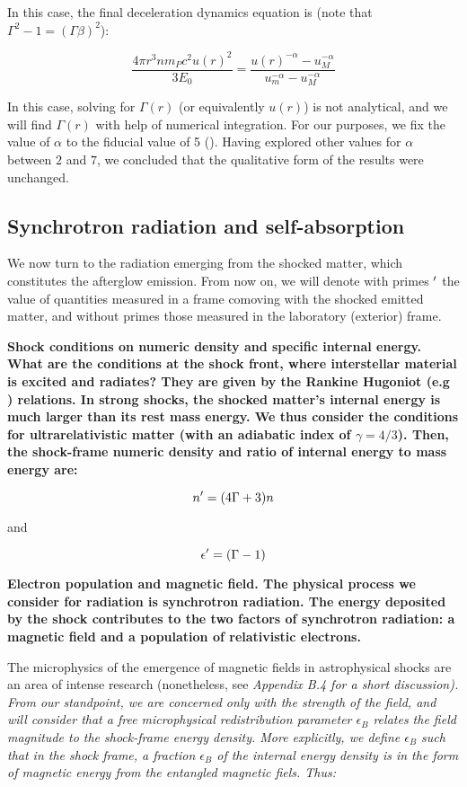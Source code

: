 In this case, the final deceleration dynamics equation is (note that $\Gamma^2 - 1 = (\Gamma\beta)^2$):

$$\frac{4\pi r^3 n m_P c^2u(r)^2}{3 E_0} = \frac{u(r) ^ {-\alpha} - u_M^{-\alpha}}{u_m ^ {-\alpha} - u_M ^ {-\alpha}} $$

In this case, solving for $\Gamma(r)$ (or equivalently $u(r)$) is not analytical, and we will find $\Gamma(r)$ with help of numerical integration. For our purposes, we fix the value of $\alpha$ to the fiducial value of 5 (\cite{13}). Having explored other values for $\alpha$ between $2$ and $7$, we concluded that the qualitative form of the results were unchanged.

\subsection{Synchrotron radiation and self-absorption}

We now turn to the radiation emerging from the shocked matter, which constitutes the afterglow emission. From now on, we will denote with primes $^{\prime}$ the value of quantities measured in a frame comoving with the shocked emitted matter, and without primes those measured in the laboratory (exterior) frame.

\bf{Shock conditions on numeric density and specific internal energy. }What are the conditions at the shock front, where interstellar material is excited and radiates? They are given by the Rankine Hugoniot (e.g \cite{39}) relations. In strong shocks, the shocked matter's internal energy is much larger than its rest mass energy. We thus consider the conditions for ultrarelativistic matter (with an adiabatic index of $\gamma = 4/3$). Then, the shock-frame numeric density and ratio of internal energy to mass energy are:

$$n^{\prime} = (4 \Gamma + 3) n$$

and

$$\epsilon^{\prime} = (\Gamma - 1) $$

\bf{Electron population and magnetic field. }The physical process we consider for radiation is synchrotron radiation. The energy deposited by the shock contributes to the two factors of synchrotron radiation: a magnetic field and a population of relativistic electrons.

The microphysics of the emergence of magnetic fields in astrophysical shocks are an area of intense research (nonetheless, see \it{Appendix B.4} for a short discussion). From our standpoint, we are concerned only with the strength of the field, and will consider that a free microphysical \it{redistribution} parameter $\epsilon_B$ relates the field magnitude to the shock-frame energy density. More explicitly, we define $\epsilon_B$ such that in the shock frame, a fraction $\epsilon_B$ of the internal energy density is in the form of magnetic energy from the entangled magnetic fiels. Thus:


